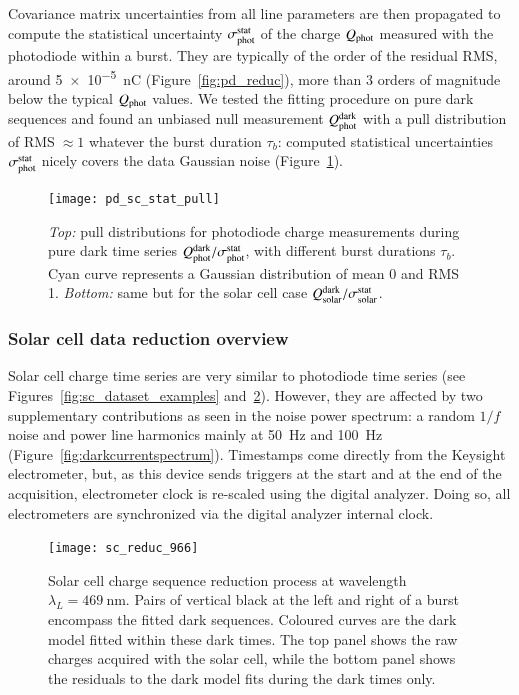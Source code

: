Covariance matrix uncertainties from all line parameters are then propagated to compute the statistical uncertainty $\sigma_{\mathrm{phot}}^{\mathrm{stat}}$ of the charge $Q_{\mathrm{phot}}$ measured with the photodiode within a burst. They are typically of the order of the residual RMS, around \SI{5e-5}{\nano\coulomb} (Figure~\ref{fig:pd_reduc}), more than 3 orders of magnitude below the typical $Q_{\mathrm{phot}}$ values. We tested the fitting procedure on pure dark sequences and found an unbiased null measurement $Q_{\mathrm{phot}}^{\rm dark}$ with a pull distribution of RMS$\;\approx 1$ whatever the burst duration $\tau_b$: computed statistical uncertainties $\sigma_{\mathrm{phot}}^{\mathrm{stat}}$ nicely covers the data Gaussian noise (Figure~\ref{fig:charge_pull}).

\begin{figure}[!h]
\centering
\texttt{[image: pd\_sc\_stat\_pull]}
\caption{\textit{Top:} pull distributions for photodiode charge measurements during pure dark time series $Q_{\mathrm{phot}}^{\rm dark} / \sigma_{\mathrm{phot}}^{\mathrm{stat}}$, with different burst durations $\tau_b$. Cyan curve represents a Gaussian distribution of mean 0 and RMS 1. \textit{Bottom:} same but for the solar cell case $Q_{\mathrm{solar}}^{\rm dark} / \sigma_{\mathrm{solar}}^{\mathrm{stat}}$.}\label{fig:charge_pull}
\end{figure}



\subsubsection{Solar cell data reduction overview}
\label{sec:solar_reduction}

Solar cell charge time series are very similar to photodiode time series (see Figures~\ref{fig:sc_dataset_examples} and~\ref{fig:sc_reduc}). However, they are affected by two supplementary contributions as seen in the noise power spectrum: a random $1/f$ noise and power line harmonics mainly at \SI{50}{\hertz} and \SI{100}{\hertz} (Figure~\ref{fig:darkcurrentspectrum}). Timestamps come directly from the Keysight electrometer, but, as this device sends triggers at the start and at the end of the acquisition, electrometer clock is re-scaled using the digital analyzer. Doing so, all electrometers are synchronized via the digital analyzer internal clock.


\begin{figure}[!h]
\centering
\texttt{[image: sc\_reduc\_966]}
\caption{Solar cell charge sequence reduction process at wavelength $\lambda_L=\SI{469}{\nm}$. Pairs of vertical black at the left and right of a burst encompass the fitted dark sequences. Coloured curves are the dark model fitted within these dark times. The top panel shows the raw charges acquired with the solar cell, while the bottom panel shows the residuals to the dark model fits during the dark times only.}\label{fig:sc_reduc}
\end{figure}

